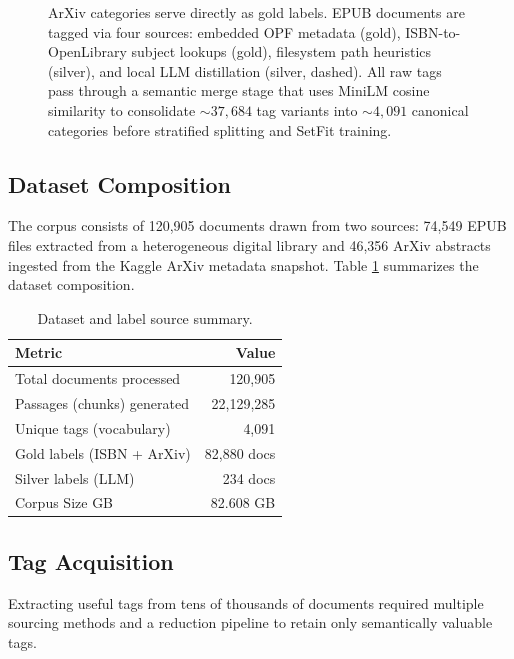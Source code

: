 \documentclass[10pt,journal,compsoc]{IEEEtran}
\newcommand{\TotalDocs}{120,905}
\newcommand{\EPUBFiles}{74,549}
\newcommand{\ArXivDocs}{46,356}
\newcommand{\TotalPassages}{22,129,285}
\newcommand{\corpussize}{82.608 GB}
\newcommand{\NumTags}{4,091}
\newcommand{\SemanticMergeIn}{37,684}
\newcommand{\SemanticMergeOut}{4{,}091}
\newcommand{\GoldLabelDocs}{82,880}
\newcommand{\SilverLabelDocs}{234}
\begin{document}
\begin{figure}[!t]
\begin{tikzpicture}
		\end{tikzpicture}
		\caption{ArXiv categories serve directly as gold labels. EPUB documents are tagged via four sources: embedded OPF metadata (gold), ISBN-to-OpenLibrary subject lookups (gold), filesystem path heuristics (silver), and local LLM distillation (silver, dashed). All raw tags pass through a semantic merge stage that uses MiniLM cosine similarity to consolidate ${\sim}\SemanticMergeIn{}$ tag variants into ${\sim}\SemanticMergeOut{}$ canonical categories before stratified splitting and SetFit training.}
		\label{fig:file_pipeline}
	\end{figure}
	
	\subsection{Dataset Composition}
	The corpus consists of \TotalDocs{} documents drawn from two sources: \EPUBFiles{}
	EPUB files extracted from a heterogeneous digital library and \ArXivDocs{} ArXiv
	abstracts ingested from the Kaggle ArXiv metadata snapshot. Table \ref{tab:dataset}
	summarizes the dataset composition.
	
	\begin{table}[htbp]
		\centering
		\caption{Dataset and label source summary.}
		\label{tab:dataset}
		\begin{tabular}{@{}lr@{}}
			\toprule
			\textbf{Metric} & \textbf{Value} \\
			\midrule
			Total documents processed & \TotalDocs{} \\
			Passages (chunks) generated & \TotalPassages{} \\
			Unique tags (vocabulary) & \NumTags{} \\
			Gold labels (ISBN + ArXiv) & \GoldLabelDocs{} docs \\
			Silver labels (LLM) & \SilverLabelDocs{} docs \\
			Corpus Size {GB} & \corpussize{}\\
			\bottomrule
		\end{tabular}
	\end{table}
	
\subsection{Tag Acquisition}

Extracting useful tags from tens of thousands of documents required multiple sourcing methods and a reduction pipeline to retain only semantically valuable tags.
\end{document}

